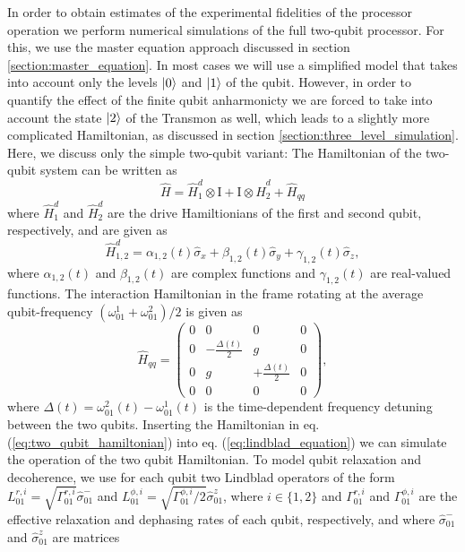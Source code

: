 In order to obtain estimates of the experimental fidelities of the processor operation we perform numerical simulations of the full two-qubit processor. For this, we use the master equation approach discussed in section \ref{section:master_equation}. In most cases we will use a simplified model that takes into account only the levels $\left| 0 \right>$ and $\left| 1 \right>$ of the qubit. However, in order to quantify the effect of the finite qubit anharmonicty we are forced to take into account the state $\left| 2 \right>$ of the Transmon as well, which leads to a slightly more complicated Hamiltonian, as discussed in section \ref{section:three_level_simulation}. Here, we discuss only the simple two-qubit variant: The Hamiltonian of the two-qubit system can be written as
%
\begin{equation}
\hat{H} = \hat{H}_1^d\otimes\mathrm{I}+\mathrm{I}\otimes\hat{H}_2^d+\hat{H}_{qq} \label{eq:two_qubit_hamiltonian}
\end{equation}
%
where $\hat{H}_1^d$ and $\hat{H}_2^d$ are the drive Hamiltionians of the first and second qubit, respectively, and are given as
%
\begin{equation}
\hat{H}_{1,2}^d = \alpha_{1,2}(t)\hat{\sigma}_x+\beta_{1,2}(t)\hat{\sigma}_y+\gamma_{1,2}(t)\hat{\sigma}_z,
\end{equation}
%
where $\alpha_{1,2}(t)$ and $\beta_{1,2}(t)$ are complex functions and $\gamma_{1,2}(t)$ are real-valued functions. The interaction Hamiltonian in the frame rotating at the average qubit-frequency $(\omega_{01}^1+\omega_{01}^2)/2$ is given as
%
\begin{equation}
\hat{H}_{qq} = \left(\begin{array}{cccc}0 & 0 & 0 & 0 \\ 0 & -\frac{\Delta(t)}{2} & g & 0 \\ 0 & g & +\frac{\Delta(t)}{2} & 0 \\ 0 & 0 & 0 & 0 \end{array}\right),
\end{equation}
%
where $\Delta(t)=\omega_{01}^2(t)-\omega_{01}^1(t)$ is the time-dependent frequency detuning between the two qubits. Inserting the Hamiltonian in eq. (\ref{eq:two_qubit_hamiltonian}) into eq. (\ref{eq:lindblad_equation}) we can simulate the operation of the two qubit Hamiltonian. To model qubit relaxation and decoherence, we use for each qubit two Lindblad operators of the form $L_{01}^{r,i}=\sqrt{\Gamma_{01}^{r,i}}\hat{\sigma}_{01}^-$ and $L_{01}^{\phi,i}=\sqrt{\Gamma_{01}^{\phi,i}/2}\hat{\sigma}_{01}^z$, where $i\in\{1,2\}$ and $\Gamma_{01}^{r,i}$ and $\Gamma_{01}^{\phi,i}$ are the effective relaxation and dephasing rates of each qubit, respectively, and where $\hat{\sigma}_{01}^-$ and $\hat{\sigma}_{01}^z$ are matrices
